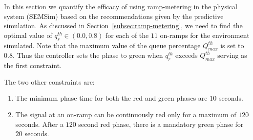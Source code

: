 \documentclass{wscpaperproc}
\theoremstyle{wsc}
\begin{document}
In this section we quantify the efficacy of using ramp-metering in the physical system (SEMSim) based on the recommendations given by the predictive simulation. As discussed in Section~\ref{subsec:ramp-metering}, we need to find the optimal value of $q^{th}_r \in (0.0,0.8)$ for each of the $11$ on-ramps for the environment simulated. Note that the maximum value of the queue percentage $Q^{th}_{max}$ is set to $0.8$. Thus the controller sets the phase to green when $q^{th}_r$ exceeds $Q^{th}_{max}$ serving as the first constraint.

The two other constraints are:
\begin{enumerate}
\item The minimum phase time for both the red and green phases are $10$ seconds.
\item The signal at an on-ramp can be continuously red only for a maximum of $120$ seconds. After a $120$ second red phase, there is a mandatory green phase for $20$ seconds.
\end{enumerate}
\end{document}
